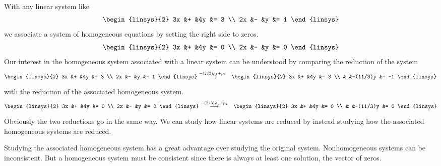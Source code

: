 \begin{example}  \label{ex:FirstExHomoSys}
With any linear system like
\begin{equation*}
  \begin{linsys}{2}
    3x  &+  &4y  &=  3  \\
    2x  &-  &y   &=  1  
  \end{linsys}
\end{equation*}
we associate a system of homogeneous equations by setting the right side to
zeros.
\begin{equation*}
  \begin{linsys}{2}
    3x  &+  &4y  &=  0  \\
    2x  &-  &y   &=  0  
  \end{linsys}
\end{equation*}
Our interest in the homogeneous system associated with a linear system
can be understood by comparing the reduction of the system
\begin{eqnarray*}
  \begin{linsys}{2}
    3x  &+  &4y  &=  3  \\
    2x  &-  &y   &=  1  
  \end{linsys}
  &\grstep{-(2/3)\rho_1+\rho_2}
  &\begin{linsys}{2}
    3x  &+  &4y        &=  3  \\
        &   &-(11/3)y   &=  -1  
   \end{linsys}
\end{eqnarray*}
with the reduction of the associated homogeneous system.
\begin{eqnarray*}
  \begin{linsys}{2}
    3x  &+  &4y  &=  0  \\
    2x  &-  &y   &=  0  
  \end{linsys}
  &\grstep{-(2/3)\rho_1+\rho_2}
  &\begin{linsys}{2}
    3x  &+  &4y        &=  0  \\
        &   &-(11/3)y   &=  0
   \end{linsys}
\end{eqnarray*}
Obviously the two reductions go in the same way.
We can study how linear systems are reduced by instead studying how
the associated homogeneous systems are reduced.
\end{example}

Studying the associated homogeneous system has a great advantage over
studying the original system.
Nonhomogeneous systems can be inconsistent.
But a homogeneous system must be consistent since there is always at least
one solution, the vector of zeros.

